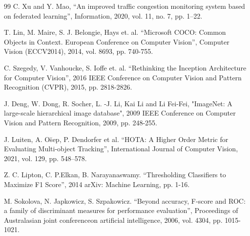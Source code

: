 \documentclass{misisarticle}
\begin{document}
\begin{thebibliography}{99}
 C. Xu and Y. Mao, “An improved traffic congestion monitoring system based on federated learning”, Information, 2020, vol. 11, no. 7, pp. 1–22.

 T. Lin, M. Maire, S. J. Belongie, Hays et. al. “Microsoft COCO: Common Objects in Context. European Conference on Computer Vision”, Computer Vision (ECCV2014), 2014, vol. 8693, pp. 740-755.

 C. Szegedy, V. Vanhoucke, S. Ioffe et. al. “Rethinking the Inception Architecture for Computer Vision”, 2016 IEEE Conference on Computer Vision and Pattern Recognition (CVPR), 2015, pp. 2818-2826.

 J. Deng, W. Dong, R. Socher, L. -J. Li, Kai Li and Li Fei-Fei, "ImageNet: A large-scale hierarchical image database", 2009 IEEE Conference on Computer Vision and Pattern Recognition, 2009, pp. 248-255.

 J. Luiten, A. Os̆ep, P. Dendorfer et al. “HOTA: A Higher Order Metric for Evaluating Multi-object Tracking”, International Journal of Computer Vision, 2021, vol. 129, pp. 548–578.

 Z. C. Lipton, C. P.Elkan, B. Narayanaswamy. “Thresholding Classifiers to Maximize F1 Score”, 2014 arXiv: Machine Learning, pp. 1-16.

 M. Sokolova, N. Japkowicz, S. Szpakowicz. “Beyond accuracy, F-score and ROC: a family of discriminant measures for performance evaluation”, Proceedings of Australasian joint conferenceon artificial intelligence, 2006, vol. 4304, pp. 1015-1021.

\end{thebibliography}
\end{document}
